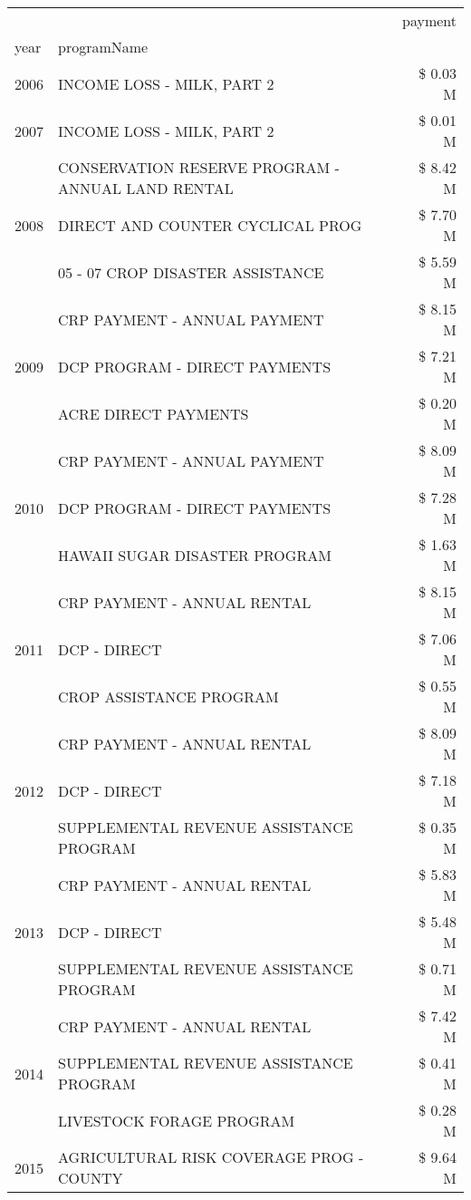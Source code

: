 \begin{tabular}{llr}
\toprule
 &  & payment \\
year & programName &  \\
\midrule
2006 & INCOME LOSS - MILK, PART 2 & \$ 0.03 M \\
\cline{1-3}
2007 & INCOME LOSS - MILK, PART 2 & \$ 0.01 M \\
\cline{1-3}
\multirow[t]{3}{*}{2008} & CONSERVATION RESERVE PROGRAM - ANNUAL LAND RENTAL & \$ 8.42 M \\
 & DIRECT AND COUNTER CYCLICAL PROG & \$ 7.70 M \\
 & 05 - 07 CROP DISASTER ASSISTANCE & \$ 5.59 M \\
\cline{1-3}
\multirow[t]{3}{*}{2009} & CRP PAYMENT - ANNUAL PAYMENT & \$ 8.15 M \\
 & DCP PROGRAM - DIRECT PAYMENTS & \$ 7.21 M \\
 & ACRE DIRECT PAYMENTS & \$ 0.20 M \\
\cline{1-3}
\multirow[t]{3}{*}{2010} & CRP PAYMENT - ANNUAL PAYMENT & \$ 8.09 M \\
 & DCP PROGRAM - DIRECT PAYMENTS & \$ 7.28 M \\
 & HAWAII SUGAR DISASTER PROGRAM & \$ 1.63 M \\
\cline{1-3}
\multirow[t]{3}{*}{2011} & CRP PAYMENT - ANNUAL RENTAL & \$ 8.15 M \\
 & DCP - DIRECT & \$ 7.06 M \\
 & CROP ASSISTANCE PROGRAM & \$ 0.55 M \\
\cline{1-3}
\multirow[t]{3}{*}{2012} & CRP PAYMENT - ANNUAL RENTAL & \$ 8.09 M \\
 & DCP - DIRECT & \$ 7.18 M \\
 & SUPPLEMENTAL REVENUE ASSISTANCE PROGRAM & \$ 0.35 M \\
\cline{1-3}
\multirow[t]{3}{*}{2013} & CRP PAYMENT - ANNUAL RENTAL & \$ 5.83 M \\
 & DCP - DIRECT & \$ 5.48 M \\
 & SUPPLEMENTAL REVENUE ASSISTANCE PROGRAM & \$ 0.71 M \\
\cline{1-3}
\multirow[t]{3}{*}{2014} & CRP PAYMENT - ANNUAL RENTAL & \$ 7.42 M \\
 & SUPPLEMENTAL REVENUE ASSISTANCE PROGRAM & \$ 0.41 M \\
 & LIVESTOCK FORAGE PROGRAM & \$ 0.28 M \\
\cline{1-3}
\multirow[t]{3}{*}{2015} & AGRICULTURAL RISK COVERAGE PROG - COUNTY & \$ 9.64 M \\

\end{tabular}
